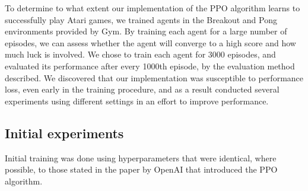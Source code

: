 \documentclass[12pt,a4paper]{article}
\begin{document}
To determine to what extent our implementation of the PPO algorithm learns to successfully play Atari games, we trained agents in the Breakout and Pong environments provided by Gym. By training each agent for a large number of episodes, we can assess whether the agent will converge to a high score and how much luck is involved. We chose to train each agent for 3000 episodes, and evaluated its performance after every 1000th episode, by the evaluation method described. We discovered that our implementation was susceptible to performance loss, even early in the training procedure, and as a result conducted several experiments using different settings in an effort to improve performance.

\subsection{Initial experiments}
Initial training was done using hyperparameters that were identical, where possible, to those stated in the paper by OpenAI that introduced the PPO algorithm. 
\end{document}
